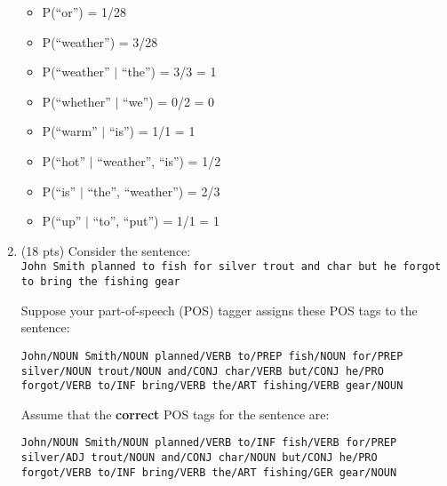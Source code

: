 \documentclass[11pt]{article}
\begin{document}
\begin{enumerate}
\begin{itemize}

\item P(``or'')  = 1/28\\

\item P(``weather'') = 3/28\\

\item P(``weather'' $\mid$ ``the'') = 3/3 = 1\\

\item P(``whether'' $\mid$ ``we'') = 0/2 = 0\\

\item P(``warm'' $\mid$ ``is'') = 1/1 = 1\\

\item P(``hot'' $\mid$ ``weather'', ``is'') = 1/2\\

\item P(``is'' $\mid$ ``the'', ``weather'') = 2/3\\

\item P(``up'' $\mid$ ``to'', ``put'') = 1/1 = 1\\


\end{itemize}



\newpage


\item (18 pts) Consider the sentence:  \\
{\tt John Smith planned to fish for silver trout and char but he forgot to bring the fishing gear}

Suppose your part-of-speech (POS) tagger assigns these POS tags to the sentence:

{\tt John/NOUN Smith/NOUN planned/VERB to/PREP fish/NOUN for/PREP silver/NOUN trout/NOUN
and/CONJ char/VERB but/CONJ he/PRO forgot/VERB to/INF bring/VERB the/ART fishing/VERB gear/NOUN}

Assume that the {\bf correct} POS tags for the sentence are:

{\tt John/NOUN Smith/NOUN planned/VERB to/INF fish/VERB for/PREP silver/ADJ
trout/NOUN and/CONJ char/NOUN but/CONJ he/PRO forgot/VERB to/INF
bring/VERB the/ART fishing/GER gear/NOUN} \\


\end{enumerate}
\end{document}
